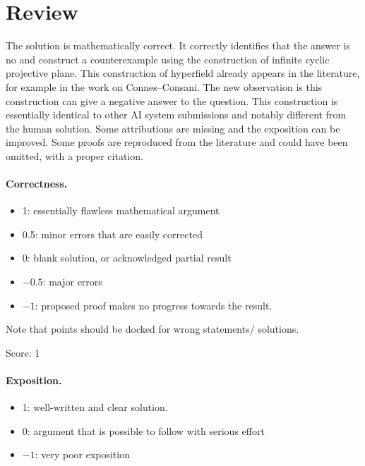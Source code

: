 \documentclass[11pt]{article}
\theoremstyle{definition}
\theoremstyle{remark}
\begin{document}
\maketitle

\section{Review}
{The solution is mathematically correct. It correctly identifies that the answer is no and construct a counterexample using the construction of infinite cyclic projective plane. This construction of hyperfield already appears in the literature, for example in the work on Connes--Consani. The new observation is this construction can give a negative answer to the question. This construction is essentially identical to other AI system submissions and notably different from the human solution. Some attributions are missing and the exposition can be improved. Some proofs are reproduced from the literature and could have been omitted, with a proper citation.}

\paragraph{Correctness.}
\begin{itemize}
	\item  1: essentially flawless mathematical argument
	\item  0.5: minor errors that are easily corrected
	\item  0: blank solution, or acknowledged partial result
	\item  $-0.5$: major errors
	\item  $-1$: proposed proof makes no progress towards the result.
\end{itemize}
Note that points should be docked for wrong statements/ solutions.

\noindent Score: 1

\paragraph{Exposition.}
\begin{itemize}
	\item  1: well-written and clear solution.
	\item  0: argument that is possible to follow with serious effort
	\item  $-1$: very poor exposition
\end{itemize}
\end{document}
